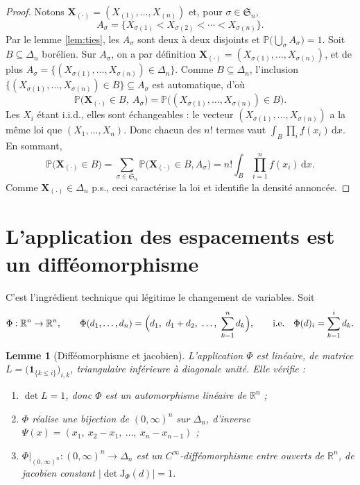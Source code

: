 \documentclass[11pt,a4paper]{article}
\theoremstyle{plain}
\newtheorem{lemme}[theoreme]{Lemme}
\theoremstyle{definition}
\theoremstyle{remark}
\newcommand{\R}{\mathbb{R}}
\newcommand{\Prob}{\mathbb{P}}
\newcommand{\Xord}[1]{X_{(#1)}}
\newcommand{\dd}{\,\mathrm{d}}
\newcommand{\Jac}{\mathrm{J}}
\begin{document}
\begin{proof}
Notons $\mathbf X_{(\cdot)}=(\Xord1,\dots,\Xord n)$ et, pour $\sigma\in\mathfrak S_n$,
\[
A_\sigma=\{X_{\sigma(1)}<X_{\sigma(2)}<\cdots<X_{\sigma(n)}\}.
\]
Par le lemme \ref{lem:ties}, les $A_\sigma$ sont deux à deux disjoints et
$\Prob\bigl(\bigcup_\sigma A_\sigma\bigr)=1$. Soit $B\subseteq\Delta_n$ borélien.
Sur $A_\sigma$, on a par définition
$\mathbf X_{(\cdot)}=(X_{\sigma(1)},\dots,X_{\sigma(n)})$, et de plus
$A_\sigma=\{(X_{\sigma(1)},\dots,X_{\sigma(n)})\in\Delta_n\}$. Comme
$B\subseteq\Delta_n$, l'inclusion $\{(X_{\sigma(1)},\dots,X_{\sigma(n)})\in B\}\subseteq A_\sigma$
est automatique, d'où
\[
\Prob\bigl(\mathbf X_{(\cdot)}\in B,\ A_\sigma\bigr)
=\Prob\bigl((X_{\sigma(1)},\dots,X_{\sigma(n)})\in B\bigr).
\]
Les $X_i$ étant i.i.d., elles sont échangeables : le vecteur
$(X_{\sigma(1)},\dots,X_{\sigma(n)})$ a la même loi que $(X_1,\dots,X_n)$. Donc
chacun des $n!$ termes vaut $\int_B\prod_{i}f(x_i)\dd x$. En sommant,
\[
\Prob\bigl(\mathbf X_{(\cdot)}\in B\bigr)
=\sum_{\sigma\in\mathfrak S_n}\Prob\bigl(\mathbf X_{(\cdot)}\in B,A_\sigma\bigr)
=n!\int_B\prod_{i=1}^n f(x_i)\dd x .
\]
Comme $\mathbf X_{(\cdot)}\in\Delta_n$ p.s., ceci caractérise la loi et identifie
la densité annoncée.
\end{proof}

\section{L'application des espacements est un difféomorphisme}

C'est l'ingrédient technique qui légitime le changement de variables. Soit
\[
\Phi:\R^n\to\R^n,\qquad
\Phi(d_1,\dots,d_n)=\Bigl(d_1,\ d_1+d_2,\ \dots,\ \sum_{k=1}^n d_k\Bigr),
\qquad\text{i.e.}\quad \Phi(d)_i=\sum_{k=1}^i d_k .
\]

\begin{lemme}[Difféomorphisme et jacobien]\label{lem:diffeo}
L'application $\Phi$ est linéaire, de matrice
$L=\bigl(\mathbf 1_{\{k\le i\}}\bigr)_{i,k}$, triangulaire inférieure à
diagonale unité. Elle vérifie :
\begin{enumerate}[label=(\alph*),leftmargin=2.2em,itemsep=0.15em]
  \item $\det L=1$, donc $\Phi$ est un automorphisme linéaire de $\R^n$ ;
  \item $\Phi$ réalise une bijection de $(0,\infty)^n$ sur $\Delta_n$, d'inverse
  $\Psi(x)=(x_1,\ x_2-x_1,\ \dots,\ x_n-x_{n-1})$ ;
  \item $\Phi|_{(0,\infty)^n}:(0,\infty)^n\to\Delta_n$ est un
  $C^\infty$-difféomorphisme entre ouverts de $\R^n$, de jacobien constant
  $\bigl|\det \Jac_\Phi(d)\bigr|=1$.
\end{enumerate}
\end{lemme}
\end{document}
